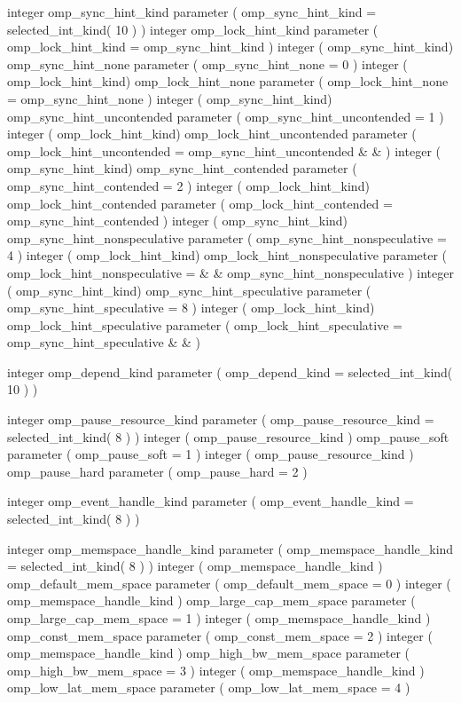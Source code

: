 {\begin{ompfSyntax}
      integer omp_sync_hint_kind
      parameter ( omp_sync_hint_kind = selected_int_kind( 10 ) )
      integer omp_lock_hint_kind
      parameter ( omp_lock_hint_kind = omp_sync_hint_kind )
      integer ( omp_sync_hint_kind) omp_sync_hint_none
      parameter ( omp_sync_hint_none = 0 )
      integer ( omp_lock_hint_kind) omp_lock_hint_none
      parameter ( omp_lock_hint_none = omp_sync_hint_none )
      integer ( omp_sync_hint_kind) omp_sync_hint_uncontended
      parameter ( omp_sync_hint_uncontended = 1 )
      integer ( omp_lock_hint_kind) omp_lock_hint_uncontended
      parameter ( omp_lock_hint_uncontended = omp_sync_hint_uncontended &
     & )
      integer ( omp_sync_hint_kind) omp_sync_hint_contended
      parameter ( omp_sync_hint_contended = 2 )
      integer ( omp_lock_hint_kind) omp_lock_hint_contended
      parameter ( omp_lock_hint_contended = omp_sync_hint_contended )
      integer ( omp_sync_hint_kind) omp_sync_hint_nonspeculative
      parameter ( omp_sync_hint_nonspeculative = 4 )
      integer ( omp_lock_hint_kind) omp_lock_hint_nonspeculative
      parameter ( omp_lock_hint_nonspeculative =                        &
     & omp_sync_hint_nonspeculative )
      integer ( omp_sync_hint_kind) omp_sync_hint_speculative
      parameter ( omp_sync_hint_speculative = 8 )
      integer ( omp_lock_hint_kind) omp_lock_hint_speculative
      parameter ( omp_lock_hint_speculative = omp_sync_hint_speculative &
     & )

      integer omp_depend_kind
      parameter ( omp_depend_kind = selected_int_kind( 10 ) )

      integer omp_pause_resource_kind
      parameter ( omp_pause_resource_kind = selected_int_kind( 8 ) )
      integer ( omp_pause_resource_kind ) omp_pause_soft
      parameter ( omp_pause_soft = 1 )
      integer ( omp_pause_resource_kind ) omp_pause_hard
      parameter ( omp_pause_hard = 2 )

      integer omp_event_handle_kind
      parameter ( omp_event_handle_kind = selected_int_kind( 8 ) )

      integer omp_memspace_handle_kind
      parameter ( omp_memspace_handle_kind = selected_int_kind( 8 ) )
      integer ( omp_memspace_handle_kind ) omp_default_mem_space
      parameter ( omp_default_mem_space = 0 )
      integer ( omp_memspace_handle_kind ) omp_large_cap_mem_space
      parameter ( omp_large_cap_mem_space = 1 )
      integer ( omp_memspace_handle_kind ) omp_const_mem_space
      parameter ( omp_const_mem_space = 2 )
      integer ( omp_memspace_handle_kind ) omp_high_bw_mem_space
      parameter ( omp_high_bw_mem_space = 3 )
      integer ( omp_memspace_handle_kind ) omp_low_lat_mem_space
      parameter ( omp_low_lat_mem_space = 4 )


\end{ompfSyntax}}
